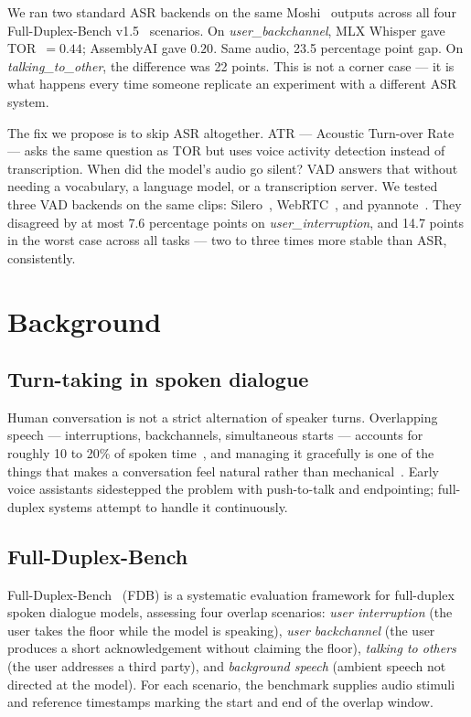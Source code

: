 \documentclass[a4paper]{article}
\begin{document}
We ran two standard ASR backends on the same Moshi~\cite{defossez2024moshi}
outputs across all four Full-Duplex-Bench v1.5~\cite{lin2025fullduplexv15}
scenarios. On \emph{user\_backchannel}, MLX Whisper gave TOR~$= 0.44$;
AssemblyAI gave $0.20$. Same audio, 23.5 percentage point gap. On
\emph{talking\_to\_other}, the difference was 22 points. This is not a corner
case --- it is what happens every time someone replicate an experiment with a
different ASR system.

The fix we propose is to skip ASR altogether. ATR --- Acoustic Turn-over Rate
--- asks the same question as TOR but uses voice activity detection instead of
transcription. When did the model's audio go silent? VAD answers that without
needing a vocabulary, a language model, or a transcription server. We tested
three VAD backends on the same clips: Silero~\cite{silero2021},
WebRTC~\cite{webrtcvad}, and pyannote~\cite{plaquet2023,bredin2020}. They
disagreed by at most 7.6 percentage points on \emph{user\_interruption}, and
14.7 points in the worst case across all tasks --- two to three times more
stable than ASR, consistently.

\section{Background}
\label{sec:background}

\subsection{Turn-taking in spoken dialogue}

Human conversation is not a strict alternation of speaker turns. Overlapping
speech --- interruptions, backchannels, simultaneous starts --- accounts for
roughly 10 to 20\% of spoken time~\cite{defossez2024moshi}, and managing it
gracefully is one of the things that makes a conversation feel natural rather
than mechanical~\cite{sacks1974,skantze2021}. Early voice assistants sidestepped
the problem with push-to-talk and endpointing; full-duplex systems attempt to
handle it continuously.

\subsection{Full-Duplex-Bench}

Full-Duplex-Bench~\cite{lin2025fullduplex} (FDB) is a systematic evaluation
framework for full-duplex spoken dialogue models, assessing four overlap
scenarios: \emph{user interruption} (the user takes the floor while the model
is speaking), \emph{user backchannel} (the user produces a short acknowledgement
without claiming the floor), \emph{talking to others} (the user addresses
a third party), and \emph{background speech} (ambient speech not directed at
the model). For each scenario, the benchmark supplies audio stimuli and
reference timestamps marking the start and end of the overlap window.
\end{document}
